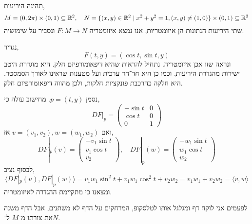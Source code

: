\subquestion{}
תהינה היריעות,
\[
	M = (0, 2 \pi) \times (0, 1) \subseteq \mathbb{R}^2,
	\quad
	N = \{ (x, y) \in \mathbb{R}^2 \mid x^2 + y^2 = 1, (x, y) \ne (1, 0) \} \times (0, 1) \subseteq \mathbb{R}^3
\]
שתי היריעות הנתונות הן איזומטריות, אנו נמצא איזומטריה $F : M \to N$ ונסביר על שימושיה.
\begin{solution}
	נגדיר,
	\[
		F(t, y)
		= (\cos t, \sin t, y)
	\]
	ונראה שזו אכן איזומטריה.
	נתחיל להראות שהיא דיפאומורפיזם חלק.
	היא מוגדרת היטב ישירות מהגדרת היריעות, וכמו כן היא חד־חד ערכית ועל מטענות שראינו לאורך הסמסטר.
	היא חלקה כהרכבת פונקציות חלקות, ולכן מהווה דיפאומורפיזם חלק.

	נסמן $p = (t, y)$.
	מחישוב עולה כי,
	\[
		D F |_p
		= \begin{pmatrix}
			- \sin t & 0 \\
			\cos t & 0 \\
			0 & 1
		\end{pmatrix} 
	\]
	ואם $v = (v_1, v_2), w = (w_1, w_2)$ אז,
	\[
		D F |_{p}(v)
		= \begin{pmatrix} - v_1 \sin t \\ v_1 \cos t \\ v_2 \end{pmatrix},
		\quad
		D F |_{p}(w)
		= \begin{pmatrix} - w_1 \sin t \\ w_1 \cos t \\ w_2 \end{pmatrix}
	\]
	לבסוף נציב,
	\[
		\langle D F |_p(u), D F |_p(w) \rangle
		= v_1 w_1 \sin^2 t + v_1 w_1 \cos^2 t + v_2 w_2
		= v_1 w_1 + v_2 w_2
		= \langle v, w \rangle
	\]
	ומצאנו כי מתקיימת ההגדרה לאיזומטריה.

	לפעמים אני לוקח דף ומגלגל אותו לטלסקופ, המרחקים על הדף לא משתנים, אבל הדף משנה את צורתו מ־$M$ ל־$N$.
\end{solution}

